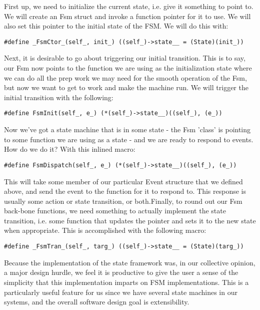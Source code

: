 First up, we need to initialize the current state, i.e. give it something to point to. We will create an Fsm struct and invoke a function pointer for it to use. We will also set this pointer to the initial state of the FSM. We will do this with:

\begin{lstlisting}
#define _FsmCtor_(self_, init_) ((self_)->state__ = (State)(init_))
\end{lstlisting}

Next, it is desirable to go about triggering our initial transition. This is to say, our Fsm now points to the function we are using as the initialization state where we can do all the prep work we may need for the smooth operation of the Fsm, but now we want to get to work and make the machine run. We will trigger the initial transition with the following:

\begin{lstlisting}
#define FsmInit(self_, e_) (*(self_)->state__)((self_), (e_))
\end{lstlisting}

Now we've got a state machine that is in some state - the Fsm 'class' is pointing to some function we are using as a state - and we are ready to respond to events. How do we do it? With this inlined macro:

\begin{lstlisting}
#define FsmDispatch(self_, e_) (*(self_)->state__)((self_), (e_))
\end{lstlisting}


This will take some member of our particular Event structure that we defined above, and send the event to the function for it to respond to. This response is usually some action or state transition, or both.Finally, to round out our Fsm back-bone functions, we need something to actually implement the state transition, i.e. some function that updates the pointer and sets it to the new state when appropriate. This is accomplished with the following macro:
\begin{lstlisting}
#define _FsmTran_(self_, targ_) ((self_)->state__ = (State)(targ_))
\end{lstlisting}
Because the implementation of the state framework was, in our collective opinion, a major design hurdle, we feel it is productive to give the user a sense of the simplicity that this implementation imparts on FSM implementations. This is a particularly useful feature for us since we have several state machines in our systems, and the overall software design goal is extensibility.  

